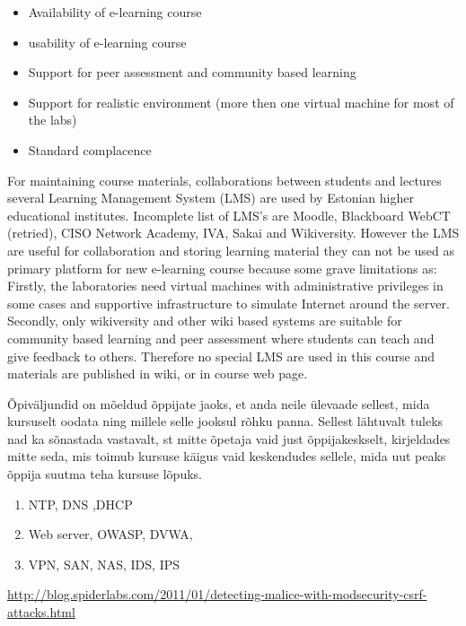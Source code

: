 \begin{itemize}
	\item Availability of e-learning course
	\item usability of e-learning course
	\item Support for peer assessment and community based learning
	\item Support for realistic environment (more then one virtual machine for most of the labs)
	\item Standard complacence
\end{itemize}

For maintaining course materials, collaborations between students and lectures several Learning Management System (\gls{LMS}) are used by Estonian higher educational institutes. Incomplete list  of \gls{LMS}'s are Moodle, Blackboard WebCT (retried), CISO Network Academy, IVA, Sakai and Wikiversity. However the \gls{LMS} are useful for collaboration and storing learning material they can not be used as primary platform for new e-learning course because some grave limitations as: Firstly, the laboratories need virtual machines with administrative privileges in some cases  and supportive infrastructure to simulate Internet around the server. Secondly, only wikiversity and other wiki based systems are suitable for community based learning and peer assessment where students can teach and give feedback to others. Therefore no special \gls{LMS} are used in this course and materials are published in wiki, or in course web page. 






Õpiväljundid on mõeldud õppijate jaoks, et anda neile ülevaade sellest, mida kursuselt oodata ning
millele selle jooksul rõhku panna. Sellest lähtuvalt tuleks nad ka sõnastada vastavalt, st mitte õpetaja
vaid just õppijakeskselt, kirjeldades mitte seda, mis toimub kursuse käigus vaid keskendudes sellele,
mida uut peaks õppija suutma teha kursuse lõpuks.

\begin{enumerate}[label=Learning Objective \arabic*.,leftmargin=*]
\item NTP, DNS ,DHCP
\item Web server, OWASP, DVWA,
\item VPN, SAN, NAS, IDS, IPS
\end{enumerate}

\url{http://blog.spiderlabs.com/2011/01/detecting-malice-with-modsecurity-csrf-attacks.html}



